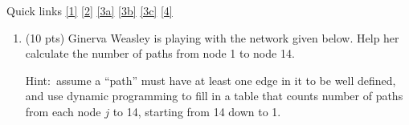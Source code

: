 \documentclass[12pt]{article}
\begin{document}
\renewcommand{\headrulewidth}{0.5pt}
\phantom{Test}

Quick links \ref{1} \ref{2} \ref{3a} \ref{3b} \ref{3c} \ref{4}


\vspace{-3mm}

\begin{enumerate}


\item \label{1} (10 pts) Ginerva Weasley is playing with the network given below. Help
her calculate the number of paths from node 1 to node 14.
	
Hint:\ assume a ``path'' must have at least one edge in it to be well defined,
and use dynamic programming to fill in a table that counts number of
paths from each node $j$ to 14, starting from 14 down to 1.


\end{enumerate}
\end{document}
